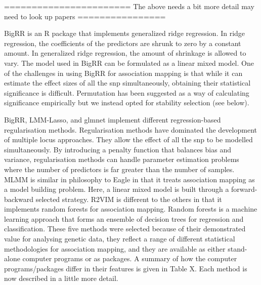 \documentclass{nature}
\begin{document}
======================= The above needs a bit more detail may need to look up papers ================





BigRR \cite{shen2013novel}  is an R package that implements generalized ridge regression.
In ridge regression, the coefficients of the predictors are shrunk 
to zero by a constant amount.  In generalized ridge regression, the amount of shrinkage is allowed to vary. 
The model used in BigRR can be formulated as a linear mixed model.
One of the challenges in using BigRR for association mapping is that while it can estimate the effect sizes of all the snp simultaneously, 
obtaining their statistical significance is difficult. 
Permutation has been suggested as a way of calculating significance 
empirically \cite{shen2013novel} but we instead opted for stability selection (see below).



BigRR, LMM-Lasso, and glmnet  implement different regression-based regularisation methods. Regularisation methods have dominated 
the development of multiple locus approaches.  They allow the effect of all the snp to be modelled simultaneously. 
By introducing a penalty function that balances bias and variance, regularisation methods can 
handle parameter estimation problems where the number of predictors is far greater than the number of samples.  
MLMM is similar in philosophy to Eagle in that it treats association mapping as a model building problem. Here, a linear mixed 
model is built through a forward-backward selected strategy.  
R2VIM is different to the others in that it implements 
random forests for association mapping. 
Random forests is a machine learning approach that forms an ensemble of decision trees for regression and 
classification. 
These five methods were selected because of their demonstrated value 
for analysing genetic data, they reflect a range of different statistical methodologies for association mapping, and they are available as 
either stand-alone computer programs or as  packages. A summary of how the computer programs/packages differ in their 
features is given in Table X. Each method is now described in a little more detail. 
\end{document}
